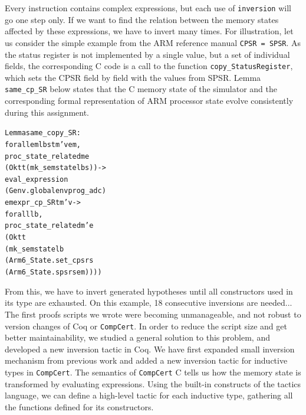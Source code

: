 \documentclass[twocolumn]{article}
\newcommand{\coqdockw}[1]{\texttt{#1}}
\newcommand{\inversion}{\coqdockw{inversion}\xspace}
\newcommand{\compcert}{\texttt{CompCert}\xspace}
\begin{document}
Every instruction contains complex expressions, but each use of
\inversion will go one step only.  If we want to find the relation
between the memory states affected by these expressions, we have to
invert many times. For illustration, let us consider the simple
example from the ARM reference manual \texttt{CPSR = SPSR}.  As
the status register is not implemented by a single value, but a set of
individual fields, the corresponding C code is a call to the function
\texttt{copy\_StatusRegister}, which sets the CPSR field by field with
the values from SPSR.  Lemma \texttt{same\_cp\_SR} below states that
the C memory state of the simulator and the corresponding formal
representation of ARM processor state evolve consistently during this
assignment.
\begin{alltt}\small
Lemma same_copy_SR :
  forall e m l b s t m' v em,
  proc_state_related m e
   (Ok tt (mk_semstate l b s)) ->
      eval_expression
       (Genv.globalenv prog_adc)
          e m expr_cp_SR t m' v ->
          forall l b,
          proc_state_related m' e
          (Ok tt
           (mk_semstate l b
             (Arm6_State.set_cpsr s
             (Arm6_State.spsr s em))))
\end{alltt}
From this, we have to invert generated hypotheses until all
constructors used in its type are exhausted. On this example, 18
consecutive inversions are needed... The first proofs scripts we wrote
were becoming unmanageable, and not robust to version changes of Coq
or \compcert.  In order to reduce the script size and get better
maintainability, we studied a general solution to this problem, and
developed a new inversion tactic in Coq. %
We have first expanded 
small inversion mechanism from previous work and added a new inversion tactic
for inductive types in \compcert.  The semantics of \compcert C tells
us how the memory state is transformed by evaluating expressions.
Using the built-in constructs of the tactics language, we can define a
high-level tactic for each inductive type, gathering all the functions
defined for its constructors.
\end{document}

